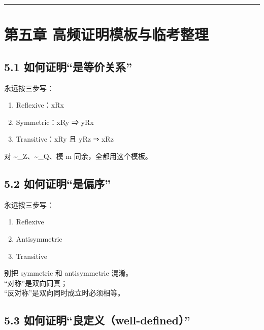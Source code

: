 \documentclass[
  11pt,
]{article}
\providecommand{\tightlist}{%
  \setlength{\itemsep}{0pt}\setlength{\parskip}{0pt}}
\begin{document}
\begin{center}\rule{0.5\linewidth}{0.5pt}\end{center}

\section{第五章
高频证明模板与临考整理}\label{ux7b2cux4e94ux7ae0-ux9ad8ux9891ux8bc1ux660eux6a21ux677fux4e0eux4e34ux8003ux6574ux7406}

\subsection{5.1
如何证明``是等价关系''}\label{ux5982ux4f55ux8bc1ux660eux662fux7b49ux4ef7ux5173ux7cfb}

永远按三步写：

\begin{enumerate}
\def\labelenumi{\arabic{enumi}.}
\tightlist
\item
  Reflexive：xRx
\item
  Symmetric：xRy ⇒ yRx
\item
  Transitive：xRy 且 yRz ⇒ xRz
\end{enumerate}

对 \textasciitilde\_Z、\textasciitilde\_Q、模 m 同余，全都用这个模板。

\subsection{5.2
如何证明``是偏序''}\label{ux5982ux4f55ux8bc1ux660eux662fux504fux5e8f}

永远按三步写：

\begin{enumerate}
\def\labelenumi{\arabic{enumi}.}
\tightlist
\item
  Reflexive
\item
  Antisymmetric
\item
  Transitive
\end{enumerate}

别把 symmetric 和 antisymmetric 混淆。\\
``对称''是双向同真；\\
``反对称''是双向同时成立时必须相等。

\subsection{5.3
如何证明``良定义（well-defined）''}\label{ux5982ux4f55ux8bc1ux660eux826fux5b9aux4e49well-defined}
\end{document}

